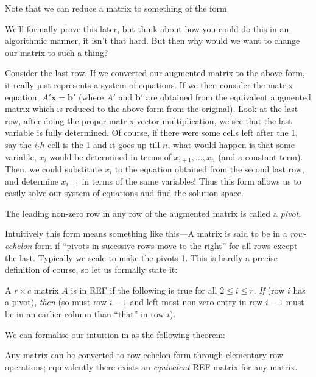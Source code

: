\begin{remark}
\label{rem:refintuit}
Note that we can reduce a matrix to something of the form


We'll formally prove this later, but think about how you could do this in an algorithmic
manner, it isn't that hard.
But then why would we want to change our matrix to such a thing?

Consider the last row. If we converted our augmented matrix to the above form, it really just represents a
system of equations. If we then consider the matrix equation, $A'\mathbf{x} = \mathbf{b}'$
(where $A'$ and $\mathbf{b}'$ are obtained from the equivalent augmented matrix which is
reduced to the above form from the original). Look at the last row, after doing the
proper matrix-vector multiplication, we see that the last variable is fully determined.
Of course, if there were some cells left after the 1, say the $i_t h$ cell is the 1
and it goes up till $n$, what would happen is that some variable, $x_i$ would be
determined in terms of $x_{i+1}, \dots, x_n$ (and a constant term). Then, we could
substitute $x_i$ to the equation obtained from the second last row, and
determine $x_{i-1}$ in terms of the same variables! Thus this form allows us to
easily solve our system of equations and find the solution space.
\end{remark}

\begin{definition}
The leading non-zero row in any row of the augmented matrix is called a \emph{pivot}.
\end{definition}

Intuitively this form means something like this---A matrix is said to be in a \emph{row-echelon} form if ``pivots in sucessive rows move to the right'' for all rows except the last.
Typically we scale to make the pivots 1. This is hardly a precise definition of course, so
let us formally state it:

\begin{definition}
	A $r \times c$ matrix $A$ is in REF if the following is true for all
	$2 \le i \le r$. \emph{If} (row $i$ has a pivot), \emph{then} (so must row $i-1$ and left
 most non-zero entry in row $i-1$ must be in an earlier column than “that” in row $i$).
\end{definition}

We can formalise our intuition in  as the following theorem:

\begin{theorem}
Any matrix can be converted to row-echelon form through elementary row operations; equivalently
there exists an \emph{equivalent} REF matrix for any matrix.
\end{theorem}

